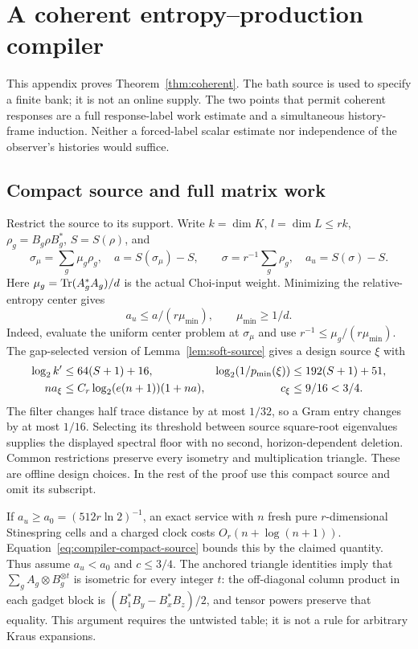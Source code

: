 \section{A coherent entropy--production compiler}
\label{app:graded}

This appendix proves Theorem~\ref{thm:coherent}. The bath source is used
to specify a finite bank; it is not an online supply. The two points that
permit coherent responses are a full response-label work estimate and a
simultaneous history-frame induction. Neither a forced-label scalar estimate
nor independence of the observer's histories would suffice.

\subsection{Compact source and full matrix work}
Restrict the source to its support. Write $k=\dim K$, $l=\dim L\leq rk$,
$\rho_g=B_g\rho B_g^*$, $S=S(\rho)$, and
\[
 \sigma_\mu=\sum_g\mu_g\rho_g,\quad a=S(\sigma_\mu)-S,
 \qquad \sigma=r^{-1}\sum_g\rho_g,\quad a_u=S(\sigma)-S.
\]
Here $\mu_g=\operatorname{Tr}(A_g^*A_g)/d$ is the actual Choi-input weight.
Minimizing the relative-entropy center gives
\begin{equation}\label{eq:weighted-uniform-gain}
 a_u\leq a/(r\mu_{\min}),\qquad \mu_{\min}\geq1/d.
\end{equation}
Indeed, evaluate the uniform center problem at $\sigma_\mu$ and use
$r^{-1}\leq\mu_g/(r\mu_{\min})$. The gap-selected version of
Lemma~\ref{lem:soft-source} gives a design source $\xi$ with
\begin{align}\label{eq:compiler-compact-source}
 \log_2 k'&\leq64(S+1)+16,& \log_2(1/p_{\min}(\xi))&\leq192(S+1)+51,\notag\\
 n a_\xi&\leq C_r\log_2(e(n+1))(1+na),&c_\xi&\leq9/16<3/4.
\end{align}
The filter changes half trace distance by at most $1/32$, so a Gram
entry changes by at most $1/16$. Selecting its threshold between source
square-root eigenvalues supplies the displayed spectral floor with no
second, horizon-dependent deletion. Common restrictions preserve every
isometry and multiplication triangle. These are offline design choices.
In the rest of the proof use this compact source and omit its subscript.

If $a_u\geq a_0=(512r\ln2)^{-1}$, an exact service with $n$ fresh pure
$r$-dimensional Stinespring cells and a charged clock costs $O_r(n+\log(n+1))$.
Equation~\eqref{eq:compiler-compact-source} bounds this by the claimed
quantity. Thus assume $a_u<a_0$ and $c\leq3/4$. The anchored triangle
identities imply that
$\sum_g A_g\otimes B_g^{\otimes t}$ is isometric for every integer $t$:
the off-diagonal column product in each gadget block is
$(B_1^*B_y-B_x^*B_z)/2$, and tensor powers preserve that equality.
This argument requires the untwisted table; it is not a rule for
arbitrary Kraus expansions.

